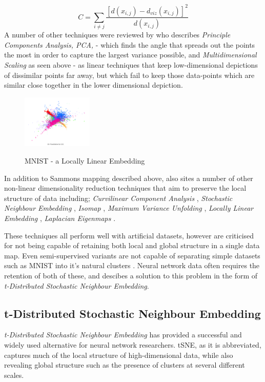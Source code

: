 \documentclass[a4paper,11pt,titlepage]{article}
\begin{document}
		$$
			C = 
			\sum\limits_{i \neq j}
			\frac{ [d(x_{i,j}) - d_{viz}(x_{i,j}) ]^2 }					{d(x_{i,j})}
		$$
		A number of other techniques were reviewed by \cite{VanderMaaten2009} who describes \textit{Principle Components Analysis, PCA,} \cite{Hotelling33} - which finds the angle that spreads out the points the most in order to capture the largest variance possible, and \textit{Multidimensional Scaling} as seen above - as linear techniques that keep low-dimensional depictions of dissimilar points far away, but which fail to keep those data-points which are similar close together in the lower dimensional depiction.
 		
 	\begin{figure}[H]
    			\centering	
			{{\includegraphics[width=0.3\textwidth]
    				{img/hinton_lle.png} 
    			}}%
    			\caption{MNIST - a Locally Linear Embedding}%
    		\label{fig:3nn}
	\end{figure}	 
 		
		\par 
		In addition to Sammons mapping described above, \cite{VanderMaaten2009} also sites a number of other non-linear dimensionality reduction techniques that aim to preserve the local structure of data including; \textit{Curvilinear Component Analysis} \cite{Demartines1995}, \textit{Stochastic Neighbour Embedding} \cite{Hinton2002}, \textit{Isomap} \cite{Tenenbaum2000}, \textit{Maximum Variance Unfolding} \cite{Weinberger2004}, \textit{Locally Linear Embedding} \cite{Roweis2000}, \textit{Laplacian Eigenmaps} \cite{Belkin2002}.

		\par 
		These techniques all perform well with artificial datasets, however are criticised for not being capable of retaining both local and global structure in a single data map. Even semi-supervised variants are not capable of separating simple datasets such as MNIST into it's natural clusters \cite{Song2007}. Neural network data often requires the retention of both of these, and \cite{Maaten2008} descibes a solution to this problem in the form of \textit{t-Distributed Stochastic Neighbour Embedding}.

	 		
 \subsection{t-Distributed Stochastic Neighbour Embedding}
 \textit{t-Distributed Stochastic Neighbour Embedding} \cite{Maaten2008} has provided a successful and widely used alternative for neural network researchers. tSNE, as it is abbreviated, captures much of the local structure of high-dimensional data, while also revealing global structure such as the presence of clusters at several different scales.
		\par 
		
\end{document}
